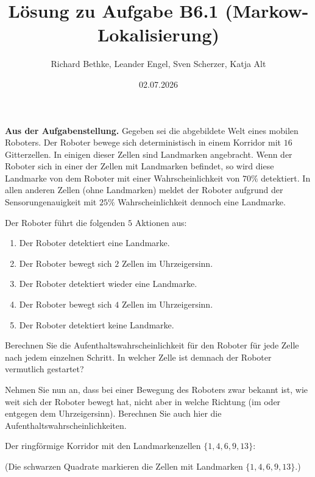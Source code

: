 \documentclass[11pt,a4paper]{article}
\title{Lösung zu Aufgabe B6.1 (Markow-Lokalisierung)}
\author{Richard Bethke, Leander Engel, Sven Scherzer, Katja Alt}
\date{02.07.2026}
\begin{document}
\maketitle

\begin{aufgabenstellung}
\textbf{Aus der Aufgabenstellung.}
Gegeben sei die abgebildete Welt eines mobilen Roboters. Der Roboter bewege sich deterministisch
in einem Korridor mit $16$ Gitterzellen. In einigen dieser Zellen sind Landmarken angebracht.
Wenn der Roboter sich in einer der Zellen mit Landmarken befindet, so wird diese Landmarke von dem
Roboter mit einer Wahrscheinlichkeit von $70\%$ detektiert. In allen anderen Zellen (ohne
Landmarken) meldet der Roboter aufgrund der Sensorungenauigkeit mit $25\%$ Wahrscheinlichkeit
dennoch eine Landmarke.

Der Roboter führt die folgenden $5$ Aktionen aus:
\begin{enumerate}
  \item Der Roboter detektiert eine Landmarke.
  \item Der Roboter bewegt sich $2$ Zellen im Uhrzeigersinn.
  \item Der Roboter detektiert wieder eine Landmarke.
  \item Der Roboter bewegt sich $4$ Zellen im Uhrzeigersinn.
  \item Der Roboter detektiert keine Landmarke.
\end{enumerate}
Berechnen Sie die Aufenthaltswahrscheinlichkeit für den Roboter für jede Zelle nach jedem
einzelnen Schritt. In welcher Zelle ist demnach der Roboter vermutlich gestartet?

Nehmen Sie nun an, dass bei einer Bewegung des Roboters zwar bekannt ist, wie weit sich der
Roboter bewegt hat, nicht aber in welche Richtung (im oder entgegen dem Uhrzeigersinn). Berechnen
Sie auch hier die Aufenthaltswahrscheinlichkeiten.
\end{aufgabenstellung}

Der ringförmige Korridor mit den Landmarkenzellen $\{1,4,6,9,13\}$:

\begin{center}
\end{center}
{\small (Die schwarzen Quadrate markieren die Zellen mit Landmarken $\{1,4,6,9,13\}$.)}
\end{document}
